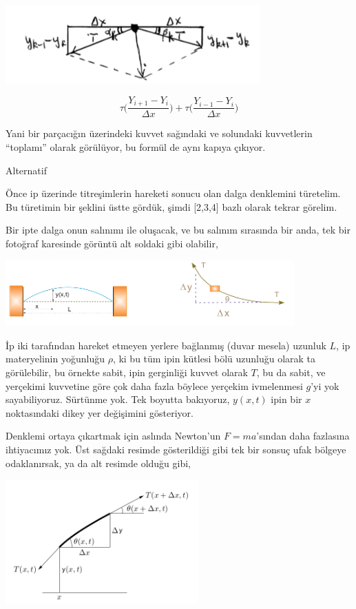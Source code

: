 \documentclass[12pt,fleqn]{article}\usepackage{../../common}
\begin{document}
\includegraphics[height=3cm]{1_15.png}

$$ 
\tau \bigg( \frac{Y_{i+1}- Y_i}{\Delta x} \bigg) +
\tau \bigg( \frac{Y_{i-1}- Y_{i}}{\Delta x} \bigg) 
$$

Yani bir parçacığın üzerindeki kuvvet sağındaki ve solundaki kuvvetlerin
``toplamı'' olarak görülüyor, bu formül de aynı kapıya çıkıyor.

Alternatif

Önce ip üzerinde titreşimlerin hareketi sonucu olan dalga denklemini
türetelim. Bu türetimin bir şeklini üstte gördük, şimdi [2,3,4] bazlı olarak
tekrar görelim.

Bir ipte dalga onun salınımı ile oluşacak, ve bu salınım sırasında bir anda, tek
bir fotoğraf karesinde görüntü alt soldaki gibi olabilir, 

\includegraphics[width=30em]{compscieng_app17wave_01.png}

İp iki tarafından hareket etmeyen yerlere bağlanmış (duvar mesela) uzunluk $L$,
ip materyelinin yoğunluğu $\rho$, ki bu tüm ipin kütlesi bölü uzunluğu olarak ta
görülebilir, bu örnekte sabit, ipin gerginliği kuvvet olarak $T$, bu da sabit,
ve yerçekimi kuvvetine göre çok daha fazla böylece yerçekim ivmelenmesi $g$'yi
yok sayabiliyoruz. Sürtünme yok. Tek boyutta bakıyoruz, $y(x,t)$ ipin bir $x$
noktasındaki dikey yer değişimini gösteriyor.

Denklemi ortaya çıkartmak için aslında Newton'un $F=ma$'sından daha fazlasına
ihtiyacımız yok. Üst sağdaki resimde gösterildiği gibi tek bir sonsuç ufak
bölgeye odaklanırsak, ya da alt resimde olduğu gibi,

\includegraphics[width=20em]{compscieng_app17wave_02.png}
\end{document}
